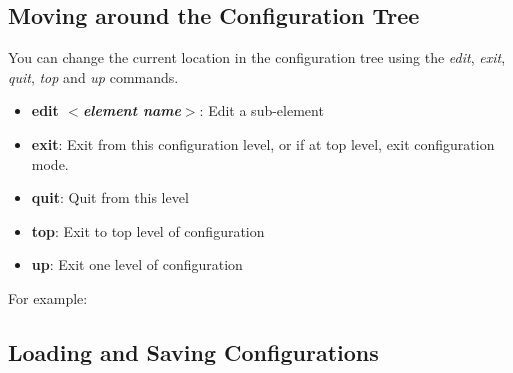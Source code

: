 \newpage
\subsection{Moving around the Configuration Tree}
You can change the current location in the configuration tree using
the \emph{edit}, \emph{exit}, \emph{quit}, \emph{top} and \emph{up} commands.
\begin{itemize}
\item \textbf{edit $<$\textit{element name}$>$}:       Edit a sub-element
\item \textbf{exit}:       Exit from this configuration level, or if
at top level, exit configuration mode.
\item \textbf{quit}:       Quit from this level
\item \textbf{top}:        Exit to top level of configuration
\item \textbf{up}:         Exit one level of configuration
\end{itemize}

\noindent
For example:
\vspace{0.1in}

\noindent{}

\subsection{Loading and Saving Configurations}

